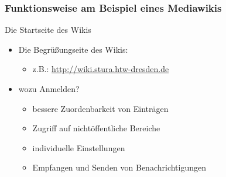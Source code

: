 \documentclass[handout]{beamer}   %
\begin{document}
\begin{frame}
  \frametitle{Funktionsweise am Beispiel eines Mediawikis}{Die Startseite des Wikis}

  \begin{itemize}[<+->]
    \item Die Begrüßungseite des Wikis:
    \begin{itemize}
      \item z.B.: \url{http://wiki.stura.htw-dresden.de}
    \end{itemize}
    \item wozu Anmelden?
    \begin{itemize}
      \item bessere Zuordenbarkeit von Einträgen
      \item Zugriff auf nichtöffentliche Bereiche
      \item individuelle Einstellungen
      \item Empfangen und Senden von Benachrichtigungen
    \end{itemize}
  \end{itemize}
\end{frame}
\end{document}
